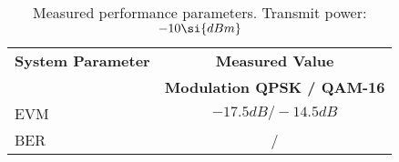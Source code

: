 \begin{table}[htbp]
  \centering
  \caption{Measured performance parameters. Transmit power: $\measPWR \si{dBm}$}
    \begin{tabular}{lc}
    \rowcolor[rgb]{ 0,  0,  0} \textcolor[rgb]{ 1,  1,  1}{\textbf{System Parameter}}	& \textcolor[rgb]{ 1,  1,  1}{\textbf{Measured Value}} 		\\
    \rowcolor[rgb]{ 0,  0,  0} \textcolor[rgb]{ 1,  1,  1}{} & \textcolor[rgb]{ 1,  1,  1}{\textbf{Modulation QPSK / QAM-16}}					\\
    	EVM 													& $-17.5\si{dB} / -14.5\si{dB}$							\\
    	BER			 											& \measBERQPSKGood / \measBERQAMGood 		\\
 \end{tabular}
  \label{tab:meas_params_good}
\end{table}